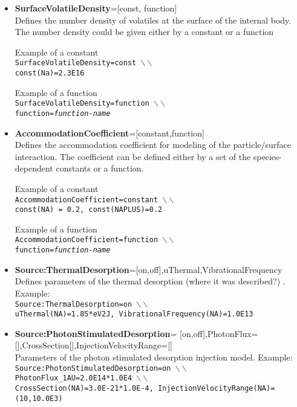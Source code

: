 \begin{itemize}
\item {\bf SurfaceVolatileDensity}=[const, function] \\ Defines the number density of volatiles at the surface of the internal body. The number density could be given either by a constant or a function 
 
Example of a constant \\ {\tt SurfaceVolatileDensity=const  $\backslash\backslash$ \\ const(Na)=2.3E16}

Example of a function \\ {\tt SurfaceVolatileDensity=function $\backslash\backslash$ \\ function={\it function-name}}


\item {\bf AccommodationCoefficient}=[constant,function] \\ Defines the accommodation coefficient for modeling of the particle/surface interaction. The coefficient can be defined either by a set of the species-dependent constants or a function.

Example of a constant \\ {\tt AccommodationCoefficient=constant $\backslash\backslash$ \\ const(NA) = 0.2, const(NAPLUS)=0.2}

Example of a function \\ {\tt AccommodationCoefficient=function $\backslash\backslash$ \\ function={\it function-name}}


\item {\bf Source:ThermalDesorption}=[on,off],uThermal,VibrationalFrequency \\ Defines parameters of the thermal desorption (where it was described?)   . Example: \\ {\tt Source:ThermalDesorption=on $\backslash\backslash$ \\ uThermal(NA)=1.85*eV2J, VibrationalFrequency(NA)=1.0E13}
 

\item {\bf Source:PhotonStimulatedDesorption}= [on,off],PhotonFlux=[],CrossSection[],InjectionVelocityRange=[] \\ Parameters of the photon stimulated desorption injection model. Example: \\   {\tt Source:PhotonStimulatedDesorption=on $\backslash\backslash$ \\ PhotonFlux\_1AU=2.0E14*1.0E4 $\backslash\backslash$ \\ CrossSection(NA)=3.0E-21*1.0E-4, InjectionVelocityRange(NA)=(10,10.0E3)}


\end{itemize}
